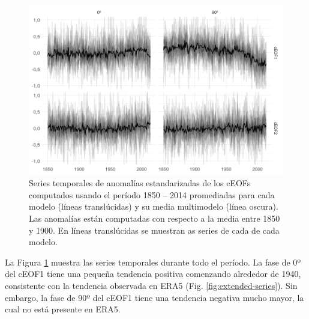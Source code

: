 \documentclass[12pt,oneside,a4paper]{reedthesis}
\begin{document}
\begin{figure}

{\centering \includegraphics{figures/50-cmip6/series-largas-1} 

}

\caption{Series temporales de anomalías estandarizadas de los cEOFs computados usando el período 1850 -- 2014 promediadas para cada modelo (líneas translúcidas) y su media multimodelo (línea oscura). Las anomalías están computadas con respecto a la media entre 1850 y 1900. En líneas translúcidas se muestran as series de cada de cada modelo.}\label{fig:series-largas}
\end{figure}



La Figura \ref{fig:series-largas} muestra las series temporales durante todo el período.
La fase de 0º del cEOF1 tiene una pequeña tendencia positiva comenzando alrededor de 1940, consistente con la tendencia observada en ERA5 (Fig. \ref{fig:extended-series}).
Sin embargo, la fase de 90º del cEOF1 tiene una tendencia negativa mucho mayor, la cual no está presente en ERA5.
\end{document}
